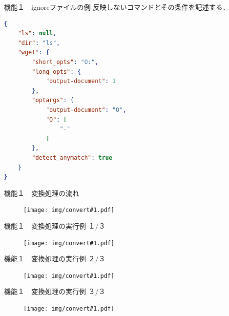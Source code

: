 \begin{frame}[fragile]{機能１　ignoreファイルの例}
    反映しないコマンドとその条件を記述する．
\begin{lstlisting}[language=json]
{
    "ls": null,
    "dir": "ls",
    "wget": {
        "short_opts": "O:",
        "long_opts": {
            "output-document": 1
        },
        "optargs": {
            "output-document": "O",
            "O": [
                "-"
            ]
        },
        "detect_anymatch": true
    }
}
\end{lstlisting}

\end{frame}




\newcommand{\MyConvertExample}[2]{
    \begin{frame}{機能１　#2}
        \begin{figure}
            \centering
            \texttt{[image: img/convert\#1.pdf]}
        \end{figure}
    \end{frame}
}

\MyConvertExample{1}{変換処理の流れ}

\MyConvertExample{2}{変換処理の実行例 １/３}
\MyConvertExample{3}{変換処理の実行例 ２/３}
\MyConvertExample{4}{変換処理の実行例 ３/３}




